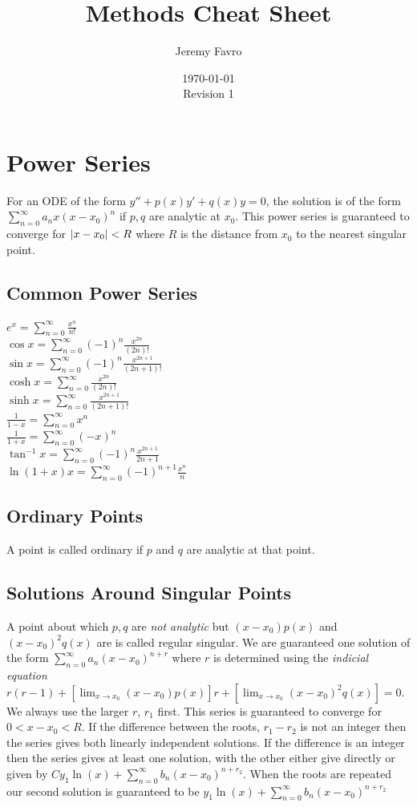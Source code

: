 \documentclass[10pt,landscape,letterpaper]{cheatsheet}
\title{Methods Cheat Sheet}
\author{Jeremy Favro}
\date{\today\\Revision 1}
\begin{document}
\maketitle

\section{Power Series}
For an ODE of the form 
$y''+p(x)y'+q(x)y=0$, the solution is of the form
$\sum_{n=0}^{\infty}a_nx(x-x_0)^n$ if $p,q$ are analytic at $x_0$. This power
series is guaranteed to converge for $\abs{x-x_0}<R$ where $R$ is the distance from $x_0$ to the nearest singular point.
\subsection{Common Power Series}
$e^x=\sum_{n=0}^{\infty}\frac{x^n}{n!}$\\
$\cos x = \sum_{n=0}^{\infty}(-1)^n\frac{x^{2n}}{(2n)!}$\\
$\sin x = \sum_{n=0}^{\infty}(-1)^n\frac{x^{2n+1}}{(2n+1)!}$\\
$\cosh x = \sum_{n=0}^{\infty}\frac{x^{2n}}{(2n)!}$\\
$\sinh x = \sum_{n=0}^{\infty}\frac{x^{2n+1}}{(2n+1)!}$\\
$\frac{1}{1-x} = \sum_{n=0}^{\infty}x^n$\\
$\frac{1}{1+x} = \sum_{n=0}^{\infty}(-x)^n$\\
$\tan^{-1} x = \sum_{n=0}^{\infty}(-1)^n\frac{x^{2n+1}}{2n+1}$\\
$\ln(1+x) x = \sum_{n=0}^{\infty}(-1)^{n+1}\frac{x^n}{n}$\\
\subsection{Ordinary Points}
A point is called ordinary if $p$ and $q$ are analytic at that point.
\subsection{Solutions Around Singular Points}
A point about which $p,q$ are \emph{not analytic} but 
$(x-x_0)p(x)$ and $(x-x_0)^2q(x)$ are is called regular singular. 
We are guaranteed one solution of the form 
$\sum_{n=0}^{\infty}a_n(x-x_0)^{n+r}$ where 
$r$ is determined using the \emph{indicial equation}
$r(r-1)+\left[\lim_{x \to x_0}(x-x_0)p(x)  \right]r+\left[\lim_{x \to x_0}(x-x_0)^2q(x)  \right]=0$. We always use the larger $r$, $r_1$ first.
This series is guaranteed to converge for $0<x-x_0<R$. If the difference between the roots, $r_1-r_2$ is not an integer
then the series gives both linearly independent solutions. If the difference is an integer then the series gives at least one solution, with the other either
give directly or given by $Cy_1\ln(x)+\sum_{n=0}^{\infty}b_n(x-x_0)^{n+r_2}$. When the roots are repeated our second solution is guaranteed to be 
$y_1\ln(x)+\sum_{n=0}^{\infty}b_n(x-x_0)^{n+r_2}$
\end{document}

